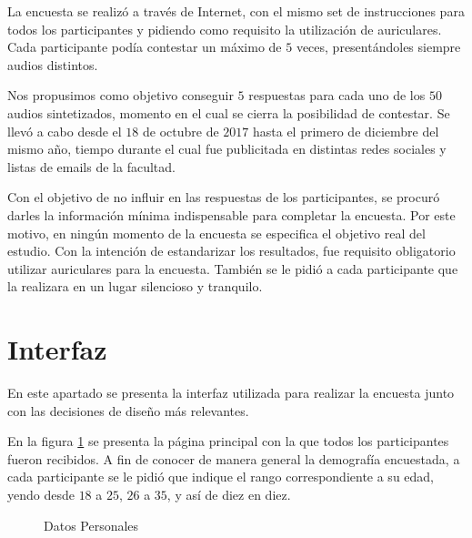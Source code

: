 La encuesta se realizó a través de Internet, con el mismo set de instrucciones para todos los participantes y pidiendo como requisito la utilización de auriculares. Cada participante podía contestar un máximo de $5$ veces, presentándoles siempre audios distintos.

Nos propusimos como objetivo conseguir $5$ respuestas para cada uno de los $50$ audios sintetizados, momento en el cual se cierra la posibilidad de contestar. Se llevó a cabo desde el $18$ de octubre de $2017$ hasta el primero de diciembre del mismo año, tiempo durante el cual fue publicitada en distintas redes sociales y listas de emails de la facultad.

Con el objetivo de no influir en las respuestas de los participantes, se procuró darles la información mínima indispensable para completar la encuesta. Por este motivo, en ningún momento de la encuesta se especifica el objetivo real del estudio. Con la intención de estandarizar los resultados, fue requisito obligatorio utilizar auriculares para la encuesta. También se le pidió a cada participante que la realizara en un lugar silencioso y tranquilo.

\section{Interfaz}

En este apartado se presenta la interfaz utilizada para realizar la encuesta junto con las decisiones de diseño más relevantes. 

En la figura \ref{personalData} se presenta la página principal con la que todos los participantes fueron recibidos. A fin de conocer de manera general la demografía encuestada, a cada participante se le pidió que indique el rango correspondiente a su edad, yendo desde $18$ a $25$, $26$ a $35$, y así de diez en diez.

\begin{figure}[htp]
\begin{center}
\end{center}
\caption{Datos Personales}
\label{personalData}
\end{figure}

